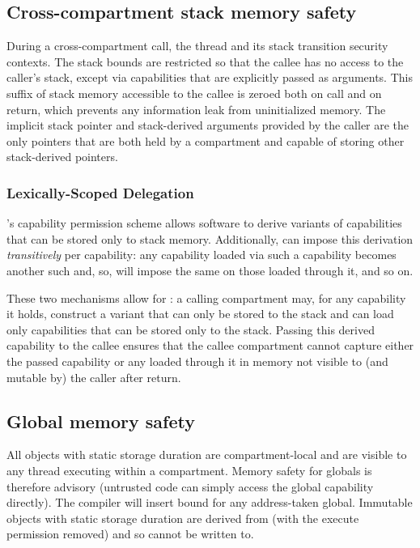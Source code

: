 \subsection{Cross-compartment stack memory safety}

During a cross-compartment call, the thread and its stack transition security contexts.
The stack bounds are restricted so that the callee has no access to the caller’s stack, except via capabilities that are explicitly passed as arguments.
This suffix of stack memory accessible to the callee is zeroed both on call and on return, which prevents any information leak from uninitialized memory.
The implicit stack pointer and stack-derived arguments provided by the caller are the only pointers that are both held by a compartment and capable of storing other stack-derived pointers.

\subsubsection{Lexically-Scoped Delegation}

\cherimcuisa{}'s capability permission scheme allows software to derive variants of capabilities that can be stored only to stack memory.
Additionally, \cherimcuisa{} can impose this derivation \emph{transitively} per capability: any capability loaded via such a capability becomes another such and, so, will impose the same on those loaded through it, and so on.

These two mechanisms allow for : a calling compartment may, for any capability it holds, construct a variant that can only be stored to the stack and can load only capabilities that can be stored only to the stack.
Passing this derived capability to the callee ensures that the callee compartment cannot capture either the passed capability or any loaded through it in memory not visible to (and mutable by) the caller after return.


\subsection{Global memory safety}
All objects with static storage duration are compartment-local and are visible to any thread executing within a compartment.
Memory safety for globals is therefore advisory (untrusted code can simply access the global capability directly).
The compiler will insert bound for any address-taken global.
Immutable objects with static storage duration are derived from \PCC{} (with the execute permission removed) and so cannot be written to.

